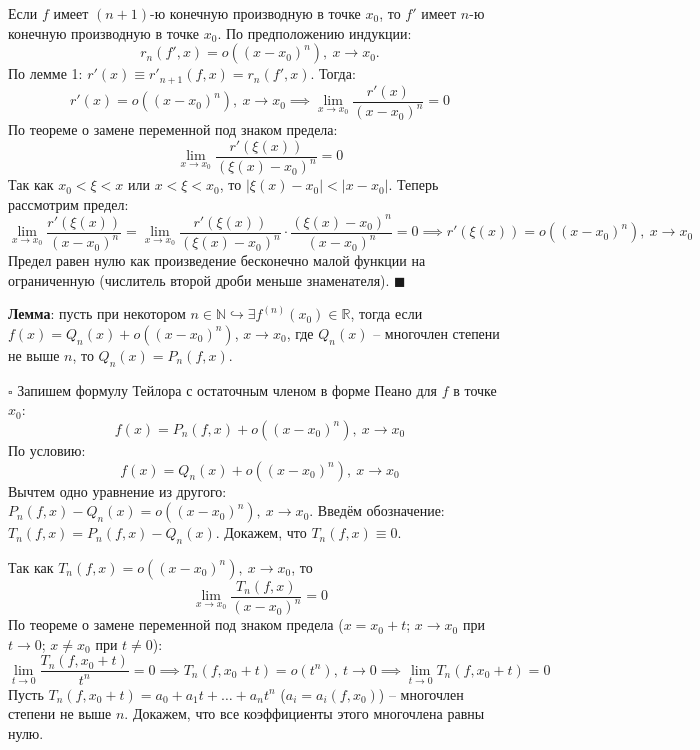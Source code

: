 \documentclass[12pt, a4paper, reqno]{article}
\begin{document}
    Если $f$ имеет $(n + 1)$-ю конечную производную в точке $x_0$, то $f'$ имеет $n$-ю конечную
    производную в точке $x_0$. По предположению индукции:
    \begin{equation*}
        r_n(f', x) = o((x - x_0)^n),\ x \to x_0.
    \end{equation*}
    По лемме 1: $r'(x) \equiv r'_{n + 1}(f, x) = r_n(f', x)$. Тогда:
    \begin{equation*}
        r'(x) = o((x - x_0)^n),\ x\to x_0 \implies \lim\limits_{x\to x_0} \dfrac{r'(x)}{(x - x_0)^n} = 0
    \end{equation*}
    По теореме о замене переменной под знаком предела:
    \begin{equation*}
        \lim\limits_{x\to x_0} \dfrac{r'(\xi(x))}{(\xi(x) - x_0)^n} = 0
    \end{equation*}
    Так как $x_0 < \xi < x$ или $x < \xi < x_0$, то $|\xi(x) - x_0| < |x - x_0|$. Теперь рассмотрим
    предел:
    \begin{equation*}
        \lim\limits_{x\to x_0} \dfrac{r'(\xi(x))}{(x - x_0)^n} =
        \lim\limits_{x\to x_0}\dfrac{r'(\xi(x))}{(\xi(x) - x_0)^n}\cdot
        \dfrac{(\xi(x) - x_0)^n}{(x - x_0)^n} = 0 \implies r'(\xi(x)) = o((x - x_0)^n),\ x \to x_0
    \end{equation*}
    Предел равен нулю как произведение бесконечно малой функции на ограниченную (числитель второй
    дроби меньше знаменателя).
    $\blacksquare$

    \textbf{Лемма}: пусть при некотором $n\in\mathbb{N}\hookrightarrow\exists f^{(n)}(x_0) \in \mathbb{R}$,
    тогда если $f(x) = Q_n(x) + o((x - x_0)^n)$, $x\to x_0$, где $Q_n(x)$ -- многочлен степени не
    выше $n$, то $Q_n(x) = P_n(f, x)$.

    $\square$ Запишем формулу Тейлора с остаточным членом в форме Пеано для $f$ в точке $x_0$:
    \begin{equation*}
        f(x) = P_n(f, x) + o((x - x_0)^n),\ x\to x_0
    \end{equation*}
    По условию:
    \begin{equation*}
        f(x) = Q_n(x) + o((x - x_0)^n),\ x\to x_0
    \end{equation*}
    Вычтем одно уравнение из другого: $P_n(f, x) - Q_n(x) = o((x - x_0)^n),\ x\to x_0$. Введём
    обозначение: $T_n(f, x) = P_n(f, x) - Q_n(x)$. Докажем, что $T_n(f, x) \equiv 0$.

    Так как $T_n(f, x) = o((x - x_0)^n),\ x\to x_0$, то
    \begin{equation*}
        \lim\limits_{x\to x_0}\dfrac{T_n(f, x)}{(x - x_0)^n} = 0
    \end{equation*}
    По теореме о замене переменной под знаком предела ($x = x_0 + t$; $x\to x_0$ при $t\to 0$;
    $x\neq x_0$ при $t\neq 0$):
    \begin{equation*}
        \lim\limits_{t\to 0}\dfrac{T_n(f, x_0 + t)}{t^n} = 0 \implies T_n(f, x_0 + t) = o(t^n),\ t \to 0
        \implies \lim\limits_{t\to 0} T_n(f, x_0 + t) = 0
    \end{equation*}
    Пусть $T_n(f, x_0 + t) = a_0 + a_1t + \ldots + a_nt^n$ ($a_i = a_i(f, x_0)$) -- многочлен степени
    не выше $n$. Докажем, что все коэффициенты этого многочлена равны нулю.
\end{document}
